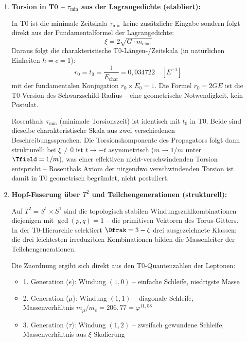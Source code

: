 \begin{enumerate}

  \item \textbf{Torsion in T0 -- $\tau_{\min}$ aus der Lagrangedichte (etabliert):}

  In T0 ist die minimale Zeitskala $\tau_{\min}$ keine zusätzliche Eingabe sondern folgt direkt aus der Fundamentalformel der Lagrangedichte:
  \begin{equation}
    \xi = 2\sqrt{G \cdot m_{\text{char}}}
  \end{equation}
  Daraus folgt die charakteristische T0-Längen-/Zeitskala (in natürlichen Einheiten $\hbar = c = 1$):
  \begin{equation}
    r_0 = t_0 = \frac{1}{E_{\text{char}}} = 0{,}034722 \quad [E^{-1}]
  \end{equation}
  mit der fundamentalen Konjugation $r_0 \times E_0 = 1$. Die Formel $r_0 = 2GE$ ist die T0-Version des Schwarzschild-Radius -- eine geometrische Notwendigkeit, kein Postulat.

  Rosenthals $\tau_{\min}$ (minimale Torsionszeit) ist identisch mit $t_0$ in T0. Beide sind dieselbe charakteristische Skala aus zwei verschiedenen Beschreibungssprachen. Die Torsionskomponente des Propagators folgt dann strukturell: bei $\xi \neq 0$ ist $t \to -t$ asymmetrisch ($m \to 1/m$ unter $\Tfield = 1/m$), was einer effektiven nicht-verschwindenden Torsion entspricht -- Rosenthals Axiom der nirgendwo verschwindenden Torsion ist damit in T0 geometrisch begründet, nicht postuliert.

  \item \textbf{Hopf-Faserung über $T^2$ und Teilchengenerationen (strukturell):}

  Auf $T^2 = S^1 \times S^1$ sind die topologisch stabilen Windungszahlkombinationen diejenigen mit $\gcd(p,q) = 1$ -- die primitiven Vektoren des Torus-Gitters. In der T0-Hierarchie selektiert $\Dfrak = 3 - \xi$ drei ausgezeichnete Klassen: die drei leichtesten irreduziblen Kombinationen bilden die Massenleiter der Teilchengenerationen.

  Die Zuordnung ergibt sich direkt aus den T0-Quantenzahlen der Leptonen:
  \begin{itemize}[noitemsep]
    \item 1. Generation ($e$): Windung $(1,0)$ -- einfache Schleife, niedrigste Masse
    \item 2. Generation ($\mu$): Windung $(1,1)$ -- diagonale Schleife, Massenverhältnis $m_\mu/m_e = 206{,}77 = \varphi^{11{,}08}$
    \item 3. Generation ($\tau$): Windung $(1,2)$ -- zweifach gewundene Schleife, Massenverhältnis aus $\xi$-Skalierung
  \end{itemize}


\end{enumerate}
